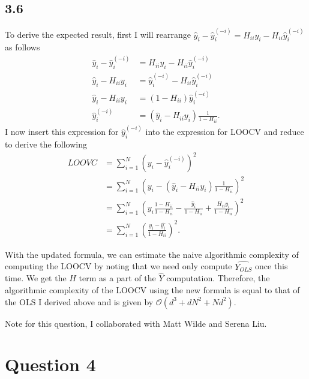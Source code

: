\documentclass[12pt]{amsart}
\begin{document}
\subsection*{3.6}

To derive the expected result, first I will rearrange $\hat{y}_i - \hat{y}_i^{(-i)} = H_{ii}y_i - H_{ii}\hat{y}_i^{(-i)}$ as follows
\begin{equation}
\begin{split}
\hat{y}_i - \hat{y}_i^{(-i)} & = H_{ii}y_i - H_{ii}\hat{y}_i^{(-i)}  \\
\hat{y}_i - H_{ii}y_i & =  \hat{y}_i^{(-i)} - H_{ii}\hat{y}_i^{(-i)} \\
\hat{y}_i - H_{ii}y_i & =  (1 - H_{ii})\hat{y}_i^{(-i)} \\
\hat{y}_i^{(-i)} & = (\hat{y}_i - H_{ii}y_i) \frac{1}{1 - H_{ii}}.
\end{split}
\end{equation} 
I now insert this expression for $\hat{y}_i^{(-i)}$ into the expression for LOOCV and reduce to derive the following
\begin{equation}
\begin{split}
LOOVC & = \sum_{i = 1}^N (y_i - \hat{y}_i^{(-i)})^2 \\
& = \sum_{i = 1}^N \left( y_i -  (\hat{y}_i - H_{ii}y_i) \frac{1}{1 - H_{ii}} \right)^2 \\
& = \sum_{i = 1}^N \left( y_i\frac{1 - H_{ii}}{1 - H_{ii}} -  \frac{\hat{y}_i}{1 - H_{ii}}  + \frac{H_{ii}y_i}{1 - H_{ii}}  \right)^2 \\
& = \sum_{i = 1}^N \left( \frac{y_i - \hat{y_i}}{1 - H_{ii}} \right)^2.
\end{split}
\end{equation}

With the updated formula, we can estimate the naive algorithmic complexity of computing the LOOCV by noting that we need only compute $\hat{Y_{OLS}}$ once this time.  We get the $H$ term as a part of the $\hat{Y}$ computation.  Therefore, the algorithmic complexity of the LOOCV using the new formula is equal to that of the OLS I derived above and is given by $\mathcal{O}(d^3 + dN^2 + Nd^2)$.

Note for this question, I collaborated with Matt Wilde and Serena Liu.


\section*{Question 4}
\end{document}
